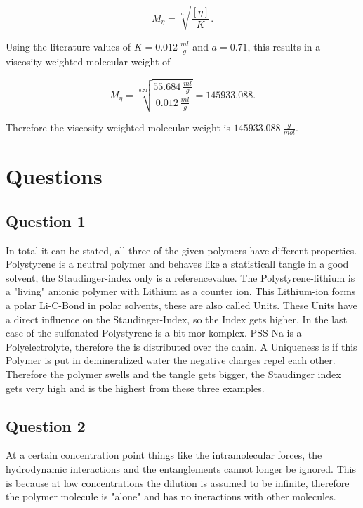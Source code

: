 \documentclass[10pt,a4paper,ngerman]{scrartcl}
\begin{document}
		\begin{equation}
			M_\eta = \sqrt[a]{\frac{[\eta]}{K}} \text{.}
		\end{equation}
		
		Using the literature values of $K = \SI{0.012}{\frac{ml}{g}}$ and $a = 0.71$, this results in a viscosity-weighted 
		molecular weight of 
		
		\begin{equation*}
			M_\eta = \sqrt[0.71]{\frac{\SI{55.684}{\frac{ml}{g}}}{\SI{0.012}{\frac{ml}{g}}}} = 145933.088 \text{.}
		\end{equation*}

		Therefore the viscosity-weighted molecular weight is $\SI{145933.088}{\frac{g}{mol}}$.\\

		
\section{Questions}

		\subsection{Question 1}

			In total it can be stated, all three of the given polymers have different properties.
			Polystyrene is a neutral polymer and behaves like a statisticall tangle in a good solvent, the Staudinger-index
			only is a referencevalue. The Polystyrene-lithium is a "living" anionic polymer with Lithium as a counter ion.
			This Lithium-ion forms a polar Li-C-Bond in polar solvents, these are also called Units.
			These Units have a direct influence on the Staudinger-Index, so the Index gets higher.
			In the last case of the sulfonated Polystyrene is a bit mor komplex. 
			PSS-Na is a Polyelectrolyte, therefore the  is distributed over the chain. 
			A Uniqueness is if this Polymer is put in demineralized water the negative charges repel each other.
			Therefore the polymer swells and the tangle gets bigger, the Staudinger index gets very high and is the highest from these three examples.


		\subsection{Question 2}

			At a certain concentration point things like the intramolecular forces, the hydrodynamic interactions and the entanglements cannot longer be ignored.
			This is because at low concentrations the dilution is assumed to be infinite, therefore the polymer molecule is "alone" and has no ineractions with other molecules.
\end{document}
